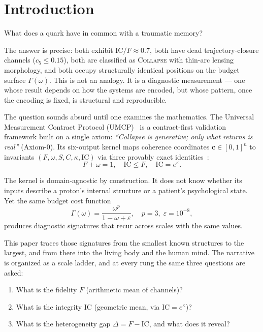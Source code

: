\documentclass[
  aps,
  prd,
  twocolumn,
  superscriptaddress,
  nofootinbib,
  floatfix
]{revtex4-2}
\newcommand{\Gam}{\Gamma}
\newcommand{\eps}{\varepsilon}
\newcommand{\beq}{\begin{equation}}
\newcommand{\eeq}{\end{equation}}
\newcommand{\regime}[1]{\textrm{\upshape\scshape#1}}
\newcommand{\tvec}{\mathbf{c}}
\newcommand{\IC}{\mathrm{IC}}
\begin{document}

\maketitle

\section{Introduction}\label{sec:intro}

What does a quark have in common with a traumatic memory?

The answer is precise: both exhibit $\IC/F \approx 0.7$,
both have dead trajectory-closure channels ($c_5 \leq 0.15$),
both are classified as \regime{Collapse} with thin-arc
lensing morphology, and both occupy structurally identical
positions on the budget surface $\Gam(\omega)$.  This is not
an analogy.  It is a diagnostic measurement --- one whose
result depends on how the systems are encoded, but whose
pattern, once the encoding is fixed, is structural and
reproducible.

The question sounds absurd until one examines the mathematics.
The Universal Measurement Contract Protocol
(UMCP)~\cite{paulus2025umcp,paulus2025physicscoherence} is a
contract-first validation framework built on a single axiom:
\emph{``Collapse is generative; only what returns is real''}
(Axiom-0).  Its six-output kernel maps coherence coordinates
$\tvec \in [0,1]^n$ to invariants
$(F, \omega, S, C, \kappa, \IC)$ via three provably exact
identities~\cite{paulus2026umcpcasepack}:
\beq\label{eq:tier1}
  F + \omega = 1, \quad
  \IC \leq F, \quad
  \IC = e^{\kappa}.
\eeq

The kernel is domain-agnostic by construction.  It does not know
whether its inputs describe a proton's internal structure or a
patient's psychological state.  Yet the same budget cost function
\beq\label{eq:gamma}
  \Gam(\omega) = \frac{\omega^p}{1 - \omega + \eps},
  \quad p = 3,\;\eps = 10^{-8},
\eeq
produces diagnostic signatures that recur across scales with
the same values.

This paper traces those signatures from the smallest known
structures to the largest, and from there into the living body
and the human mind.  The narrative is organized as a scale ladder,
and at every rung the same three questions are asked:
\begin{enumerate}
\item What is the fidelity $F$ (arithmetic mean of channels)?
\item What is the integrity $\IC$ (geometric mean, via
  $\IC = e^{\kappa}$)?
\item What is the heterogeneity gap $\Delta = F - \IC$, and
  what does it reveal?
\end{enumerate}
\end{document}
